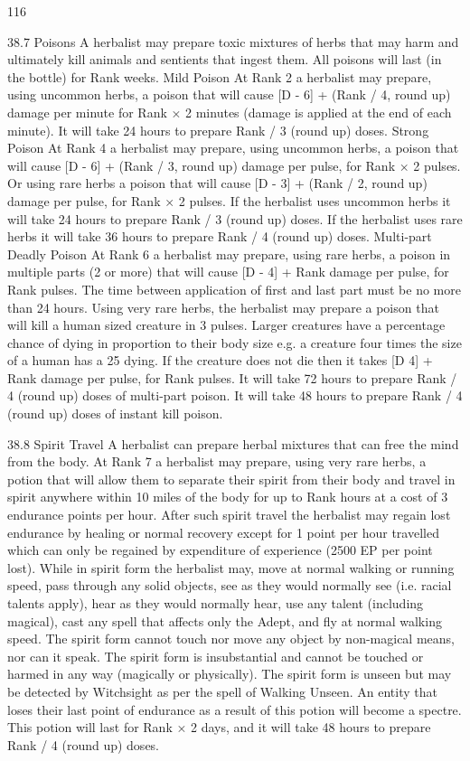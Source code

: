 \documentclass[a4paper]{article}
\begin{document}
\begin{multicols}{3}
116

38.7 Poisons
A herbalist may prepare toxic mixtures of herbs
that may harm and ultimately kill animals and
sentients that ingest them. All poisons will last (in
the bottle) for Rank weeks.
Mild Poison
At Rank 2 a herbalist may prepare, using uncommon herbs, a poison that will cause [D - 6] + (Rank
/ 4, round up) damage per minute for Rank × 2
minutes (damage is applied at the end of each
minute). It will take 24 hours to prepare Rank / 3
(round up) doses.
Strong Poison
At Rank 4 a herbalist may prepare, using uncommon herbs, a poison that will cause [D - 6] + (Rank
/ 3, round up) damage per pulse, for Rank × 2
pulses. Or using rare herbs a poison that will cause
[D - 3] + (Rank / 2, round up) damage per pulse,
for Rank × 2 pulses. If the herbalist uses uncommon herbs it will take 24 hours to prepare Rank / 3
(round up) doses. If the herbalist uses rare herbs it
will take 36 hours to prepare Rank / 4 (round up)
doses.
Multi-part Deadly Poison
At Rank 6 a herbalist may prepare, using rare
herbs, a poison in multiple parts (2 or more) that
will cause [D - 4] + Rank damage per pulse, for
Rank pulses. The time between application of first
and last part must be no more than 24 hours. Using
very rare herbs, the herbalist may prepare a poison
that will kill a human sized creature in 3 pulses.
Larger creatures have a percentage chance of dying
in proportion to their body size e.g. a creature four
times the size of a human has a 25%
dying. If the creature does not die then it takes [D 4] + Rank damage per pulse, for Rank pulses. It
will take 72 hours to prepare Rank / 4 (round up)
doses of multi-part poison. It will take 48 hours to
prepare Rank / 4 (round up) doses of instant kill
poison.

38.8 Spirit Travel
A herbalist can prepare herbal mixtures that can
free the mind from the body.
At Rank 7 a herbalist may prepare, using very rare
herbs, a potion that will allow them to separate
their spirit from their body and travel in spirit
anywhere within 10 miles of the body for up to
Rank hours at a cost of 3 endurance points per
hour. After such spirit travel the herbalist may
regain lost endurance by healing or normal recovery except for 1 point per hour travelled which can
only be regained by expenditure of experience
(2500 EP per point lost). While in spirit form the
herbalist may, move at normal walking or running
speed, pass through any solid objects, see as they
would normally see (i.e. racial talents apply), hear
as they would normally hear, use any talent (including magical), cast any spell that affects only
the Adept, and fly at normal walking speed. The
spirit form cannot touch nor move any object by
non-magical means, nor can it speak. The spirit
form is insubstantial and cannot be touched or
harmed in any way (magically or physically). The
spirit form is unseen but may be detected by
Witchsight as per the spell of Walking Unseen. An
entity that loses their last point of endurance as a
result of this potion will become a spectre. This
potion will last for Rank × 2 days, and it will take
48 hours to prepare Rank / 4 (round up) doses.


\end{multicols}
\end{document}
